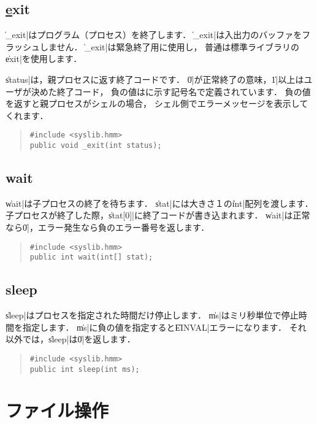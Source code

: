 \subsection{\ul exit}

\|_exit|はプログラム（プロセス）を終了します．
\|_exit|は入出力のバッファをフラッシュしません．
\|_exit|は緊急終了用に使用し，
普通は標準ライブラリの\|exit|を使用します．

\|status|は，親プロセスに返す終了コードです．
\|0|が正常終了の意味，\|1|以上はユーザが決めた終了コード，
負の値はに示す記号名で定義されています．
負の値を返すと親プロセスがシェルの場合，
シェル側でエラーメッセージを表示してくれます．

\begin{quote}
\begin{verbatim}
#include <syslib.hmm>
public void _exit(int status);
\end{verbatim}
\end{quote}

\subsection{wait}

\|wait|は子プロセスの終了を待ちます．
\|stat|には大きさ１の\|int|配列を渡します．
子プロセスが終了した際，\|stat[0]|に終了コードが書き込まれます．
\|wait|は正常なら\|0|，エラー発生なら負のエラー番号を返します．

\begin{quote}
\begin{verbatim}
#include <syslib.hmm>
public int wait(int[] stat);
\end{verbatim}
\end{quote}

\subsection{sleep}

\|sleep|はプロセスを指定された時間だけ停止します．
\|ms|はミリ秒単位で停止時間を指定します．
\|ms|に負の値を指定すると\|EINVAL|エラーになります．
それ以外では，\|sleep|は\|0|を返します．

\begin{quote}
\begin{verbatim}
#include <syslib.hmm>
public int sleep(int ms);
\end{verbatim}
\end{quote}

\section{ファイル操作}

